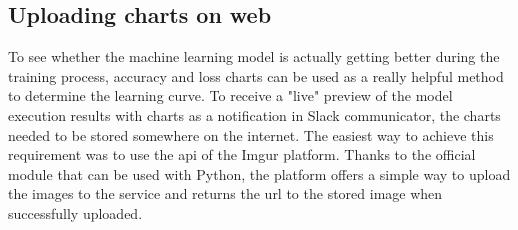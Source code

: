 \subsection{Uploading charts on web}\label{subsec:charts-web-uploading}
To see whether the machine learning model is actually getting better during the training process, accuracy and loss charts can be used as a really helpful method to determine the learning curve.
To receive a "live" preview of the model execution results with charts as a notification in Slack communicator, the charts needed to be stored somewhere on the internet.
The easiest way to achieve this requirement was to use the \gls{api} of the Imgur platform.
Thanks to the official module that can be used with Python, the platform offers a simple way to upload the images to the service and returns the \gls{url} to the stored image when successfully uploaded.
